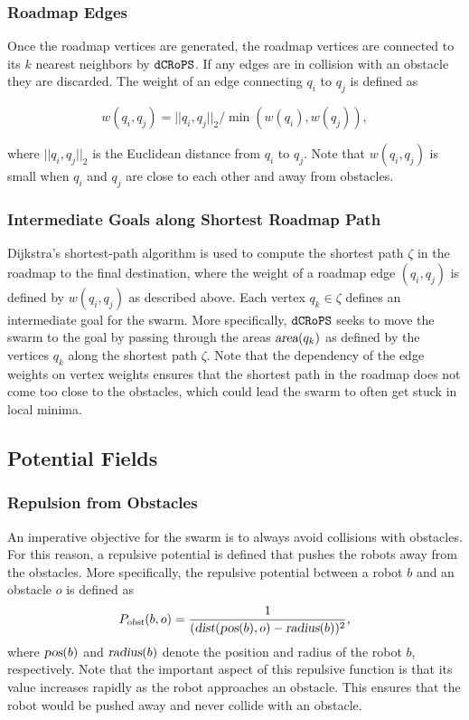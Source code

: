 \documentclass[letterpaper, 10pt, conference]{ieeeconf}
\newcommand{\Acronym}[1]{\ensuremath{{\small{\texttt{#1}}}}}
\newcommand{\Var}[1]{\ensuremath{{\small{\textsl{#1}}}}}
\newcommand{\Name}{\Acronym{dCRoPS}}
\begin{document}
\subsubsection{Roadmap Edges}

Once the roadmap vertices are generated, the roadmap vertices are connected to
its $k$ nearest neighbors by $\Name$. If any edges are in collision with an
obstacle they are discarded. The weight of an edge connecting $q_i$ to $q_j$ is
defined as

$$ w(q_i, q_j) = ||q_i, q_j||_2 / \min(w(q_i), w(q_j)), $$ 

where $||q_i, q_j||_2$ is the Euclidean distance from $q_i$ to $q_j$. Note that
$w(q_i, q_j)$ is small when $q_i$ and $q_j$ are close to each other and away
from obstacles.



\subsubsection{Intermediate Goals along Shortest Roadmap Path}

Dijkstra's shortest-path algorithm is used to compute the shortest path $\zeta$
in the roadmap to the final destination, where the weight of a roadmap edge
$(q_i, q_j)$ is defined by $w(q_i, q_j)$ as described above. Each vertex $q_k
\in \zeta$ defines an intermediate goal for the swarm. More specifically,
$\Name$ seeks to move the swarm to the goal by passing through the areas
$\Var{area}(q_k)$ as defined by the vertices $q_k$ along the shortest path
$\zeta$. Note that the dependency of the edge weights on vertex weights ensures
that the shortest path in the roadmap does not come too close to the obstacles,
which could lead the swarm to often get stuck in local minima.

\subsection{Potential Fields}
\label{sec:PF}

\subsubsection{Repulsion from Obstacles}
\label{sec:PFobst} An imperative objective for
the swarm is to always avoid collisions with obstacles. For this
reason, a repulsive potential is defined that pushes the robots away
from the obstacles. More specifically, the repulsive potential between
a robot $b$ and an obstacle $o$ is defined as
$$ P_\Var{obst}(b, o) = \frac{1}{(\Var{dist}(\Var{pos}(b), o) - \Var{radius}(b))^2},
$$ where $\Var{pos}(b)$ and
$\Var{radius}(b)$ denote the position and radius of the robot $b$, respectively. Note that the
important aspect of this repulsive function is that its value
increases rapidly as the robot approaches an obstacle. This ensures
that the robot would be pushed away and never collide with an obstacle.
\end{document}
